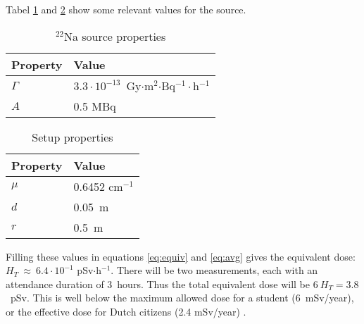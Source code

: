 Tabel \ref{tab:na-prop} and \ref{tab:setup} show some relevant values for the source.
\begin{table}[H]
		\caption{$^{22}$Na source properties}
    \begin{tabularx}{\linewidth}{l X}
			Property & Value \\ \hline\hline
      $\Gamma$ & $3.3\cdot 10^{-13}$~Gy$\cdot$m$^2$$\cdot$Bq$^{-1}\cdot$h$^{-1}$ \\
      $A$ & 0.5 MBq \\ \hline
    \end{tabularx}
    \label{tab:na-prop}
\end{table}

\begin{table}[H]
    \caption{Setup properties}
		\begin{tabularx}{\linewidth}{l X}
			Property & Value \\ \hline\hline
      $\mu$ & 0.6452 cm$^{-1}$ \\
      $d$ & 0.05~m \\
      $r$ & 0.5~m \\\hline
    \end{tabularx}
    \label{tab:setup}
\end{table}Filling these values in equations \ref{eq:equiv} and \ref{eq:avg} gives the equivalent dose: $H_T~\approx~6.4\cdot 10^{-1}$ pSv$\cdot$h$^{-1}$. There will be two measurements, each with an attendance duration of 3~hours. Thus the total equivalent dose will be $6~H_T = 3.8$~pSv. This is well below the maximum allowed dose for a student (6~mSv/year), or the effective dose for Dutch citizens (2.4 mSv/year)  \cite{Brouwer}.

